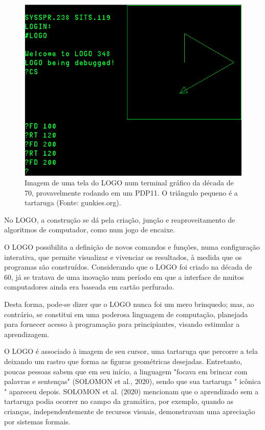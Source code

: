 \begin{figure}[htb]
\begin{minipage}[b]{0.4\linewidth}
                \includegraphics[width=1.0\linewidth]{../../../imagens/logo-PDP11.png}
                \caption{Imagem de uma tela do LOGO num terminal gráfico da década de 70, provavelmente rodando em um PDP11. O triângulo pequeno é a tartaruga (Fonte: gunkies.org).}
                \label{ca83b217b58f57e503ff496c6c6f47bee5dc77cd}
\end{minipage}
\hspace{0.5cm}
\end{figure}



No LOGO, a construção se dá pela criação, junção e reaproveitamento de algoritmos de computador, como num jogo de encaixe.

O LOGO possibilita a definição de novos comandos e funções, numa configuração interativa, que permite visualizar e vivenciar os resultados, à medida que os programas são construídos. Considerando que o LOGO foi criado na década de 60, já se tratava de uma inovação num período em que a interface de muitos computadores ainda era baseada em cartão perfurado.

Desta forma, pode-se dizer que o LOGO nunca foi um mero brinquedo; mas, ao contrário, se constitui em uma poderosa linguagem de computação, planejada para fornecer acesso à programação para principiantes, visando estimular a aprendizagem.

O LOGO é associado à imagem de seu cursor, uma tartaruga que percorre a tela deixando um rastro que forma as figuras geométricas desejadas. Entretanto, poucas pessoas sabem que em seu início, a linguagem "focava em brincar com palavras e sentenças" (SOLOMON et al., 2020), sendo que sua tartaruga " icônica " apareceu depois.  SOLOMON et al. (2020) mencionam que o aprendizado sem a tartaruga podia ocorrer no campo da gramática, por exemplo, quando as crianças, independentemente de recursos visuais, demonstravam uma apreciação por sistemas formais.

